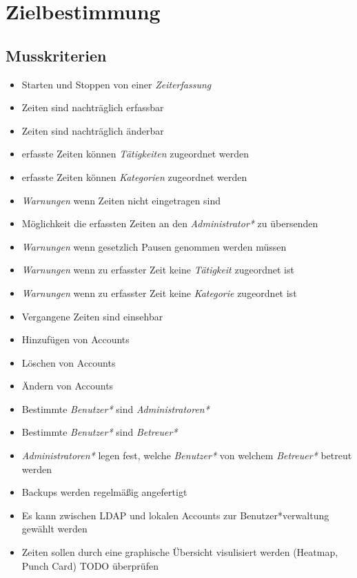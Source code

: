 \section{Zielbestimmung}

\subsection{Musskriterien}

\begin{itemize}
	\item Starten und Stoppen von einer \emph{Zeiterfassung}
	\item Zeiten sind nachträglich erfassbar
	\item Zeiten sind nachträglich änderbar
	\item erfasste Zeiten können \emph{Tätigkeiten} zugeordnet werden
	\item erfasste Zeiten können \emph{Kategorien} zugeordnet werden
	\item \emph{Warnungen} wenn Zeiten nicht eingetragen sind
	\item Möglichkeit die erfassten Zeiten an den \emph{Administrator*} zu übersenden
	\item \emph{Warnungen} wenn gesetzlich Pausen genommen werden müssen
	\item \emph{Warnungen} wenn zu erfasster Zeit keine \emph{Tätigkeit} zugeordnet ist
	\item \emph{Warnungen} wenn zu erfasster Zeit keine \emph{Kategorie} zugeordnet ist
	\item Vergangene Zeiten sind einsehbar
	\item Hinzufügen von Accounts
	\item Löschen von Accounts
	\item Ändern von Accounts
	\item Bestimmte \emph{Benutzer*} sind \emph{Administratoren*}
	\item Bestimmte \emph{Benutzer*} sind \emph{Betreuer*}
	\item \emph{Administratoren*} legen fest, welche \emph{Benutzer*} von welchem \emph{Betreuer*} betreut werden
	\item Backups werden regelmäßig angefertigt
	\item Es kann zwischen LDAP und lokalen Accounts zur Benutzer*verwaltung gewählt werden
	\item Zeiten sollen durch eine graphische Übersicht visulisiert werden (Heatmap, Punch Card) TODO überprüfen
\end{itemize}


